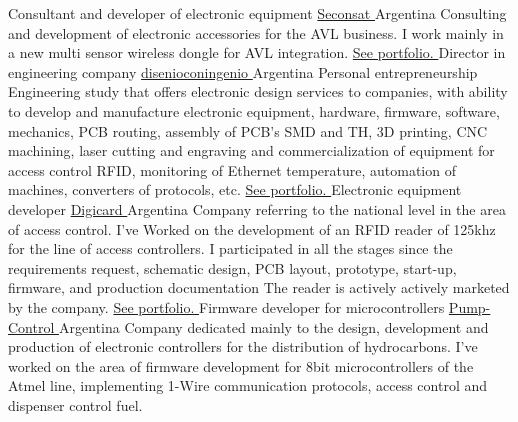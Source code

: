       {Consultant and developer of electronic equipment   }{\href{ www.seconsat.com             }{ Seconsat          }  }{Argentina                   }{}{ Consulting and development of electronic accessories for the AVL business. I work mainly in a new multi sensor wireless dongle for AVL integration. \hyperlink                                                                                                                                                                                                                                                                                                              {subsec:seconsat}{ See portfolio. } }
      {Director in engineering company                    }{\href{ www.disenioconingenio.com.ar }{ disenioconingenio }  }{Argentina                   }{}{ Personal entrepreneurship Engineering study that offers electronic design services to companies, with ability to develop and manufacture electronic equipment, hardware, firmware, software, mechanics, PCB routing, assembly of PCB's SMD and TH, 3D printing, CNC machining, laser cutting and engraving and commercialization of equipment for access control RFID, monitoring of Ethernet temperature, automation of machines, converters of protocols, etc. \hyperlink {subsec:dci}{ See portfolio. } }
      {Electronic equipment developer                     }{\href{ www.digicard.com.ar          }{ Digicard          }  }{Argentina                   }{}{ Company referring to the national level in the area of access control. I've Worked on the development of an RFID reader of 125khz for the line of access controllers. I participated in all the stages since the requirements request, schematic design, PCB layout, prototype, start-up, firmware, and production documentation The reader is actively actively marketed by the company. \hyperlink                                                                      {subsec:digicard}{ See portfolio. } }
      {Firmware developer for microcontrollers            }{\href{ www.pump-control.com.ar      }{ Pump-Control      }  }{Argentina                   }{}{ Company dedicated mainly to the design, development and production of electronic controllers for the distribution of hydrocarbons. I've worked on the area of firmware development for 8bit microcontrollers of the Atmel line, implementing 1-Wire communication protocols, access control and dispenser control fuel.                                                                                                                                                                     }
   \vfill{}


